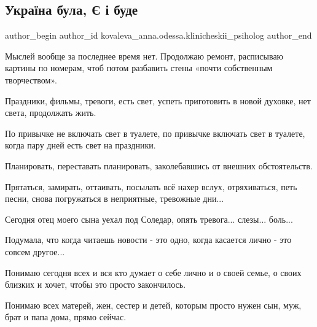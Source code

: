  
 
 
 
 

\subsection{Україна була, Є і буде}
\label{sec:10_01_2023.fb.kovaleva_anna.odessa.klinicheskii_psiholog.1.ukra_na_bula______bu}

\ifcmt
 author_begin
   author_id kovaleva_anna.odessa.klinicheskii_psiholog
 author_end
\fi

Мыслей вообще за последнее время нет.  Продолжаю ремонт, расписываю картины по
номерам, чтоб потом разбавить стены «почти собственным творчеством».

Праздники, фильмы, тревоги, есть свет, успеть приготовить в новой духовке, нет
света, продолжать жить.

По привычке не включать свет в туалете, по привычке включать свет в туалете,
когда пару дней есть свет на праздники.

Планировать, переставать планировать, заколебавшись от внешних обстоятельств.

Прятаться, замирать, оттаивать, посылать всё нахер вслух, отряхиваться, петь
песни, снова погружаться в неприятные, тревожные дни...

Сегодня отец моего сына уехал под Соледар, опять тревога... слезы... боль...

Подумала, что когда читаешь новости - это одно, когда касается лично - это
совсем другое...

Понимаю сегодня всех и вся кто думает о себе лично и о своей семье, о своих
близких и хочет, чтобы это просто закончилось.

Понимаю всех матерей, жен, сестер и детей, которым просто нужен сын, муж, брат
и папа дома, прямо сейчас.

